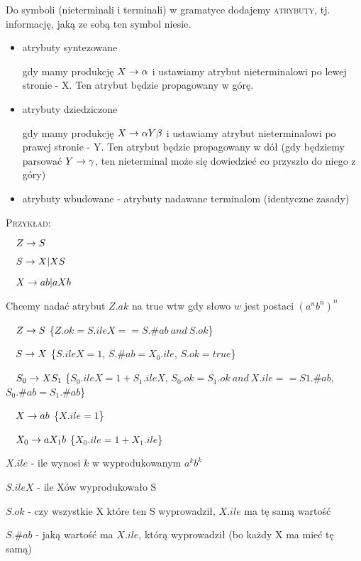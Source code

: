 Do symboli (nieterminali i terminali) w gramatyce dodajemy \textsc{atrybuty}, tj. informację, jaką ze sobą ten symbol niesie.

\begin{itemize}
    \item atrybuty syntezowane
    
    gdy mamy produkcję $X \rightarrow \alpha$ i ustawiamy atrybut nieterminalowi po lewej stronie - X. Ten atrybut będzie propagowany w górę. 
    
    \item atrybuty dziedziczone
    
    gdy mamy produkcję $X \rightarrow \alpha Y \beta$ i ustawiamy atrybut nieterminalowi po prawej stronie - Y. Ten atrybut będzie propagowany w dół (gdy będziemy parsować $Y \rightarrow \gamma$, ten nieterminal może się dowiedzieć co przyszło do niego z góry)
    
    \item atrybuty wbudowane - atrybuty nadawane terminalom (identyczne zasady)
\end{itemize}

\textsc{Przykład}:

$\quad Z \rightarrow S$

$\quad S \rightarrow X | XS$

$\quad X \rightarrow ab | aXb$

Chcemy nadać atrybut $Z.ak$ na true wtw gdy słowo $w$ jest postaci $(a^nb^n)^n$

$\quad Z \rightarrow S$   \{$Z.ok = S.ileX == S.\#ab\ and\ S.ok$\}

$\quad S \rightarrow X$    \{$S.ileX = 1$, $S.\#ab = X_0.ile$, $S.ok = true$\}

$\quad S_0 \rightarrow XS_1$ \{$S_0.ileX = 1 + S_1.ileX$, $S_0.ok = S_1.ok\ and\ X.ile == S1.\#ab$, $S_0.\#ab = S_1.\#ab$\}

$\quad X \rightarrow ab$ \{$X.ile = 1$\}

$\quad X_0 \rightarrow aX_1b$ \{$X_0.ile = 1 + X_1.ile$\}

$X.ile$ - ile wynosi $k$ w wyprodukowanym $a^kb^k$

$S.ileX$ - ile Xów wyprodukowało S

$S.ok$ - czy wszystkie X które ten S wyprowadził, $X.ile$ ma tę samą wartość

$S.\#ab$ - jaką wartość ma $X.ile$, którą wyprowadził (bo każdy X ma mieć tę samą)